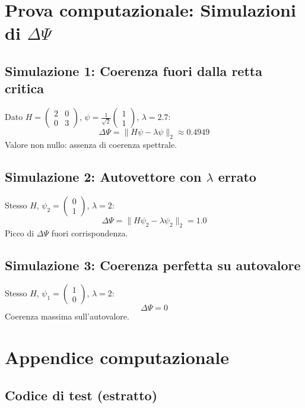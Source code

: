\documentclass[12pt]{article}
\theoremstyle{definition}
\begin{document}
\section{Prova computazionale: Simulazioni di $\Delta\Psi$}

\subsection{Simulazione 1: Coerenza fuori dalla retta critica}

Dato $H = \begin{pmatrix}2 & 0\\0 & 3\end{pmatrix}$, $\psi = \frac{1}{\sqrt{2}}\begin{pmatrix}1\\1\end{pmatrix}$, $\lambda=2.7$:
\[
\Delta\Psi = \| H\psi - \lambda\psi \|_2 \approx 0.4949
\]
Valore non nullo: assenza di coerenza spettrale.

\subsection{Simulazione 2: Autovettore con $\lambda$ errato}

Stesso $H$, $\psi_2 = \begin{pmatrix}0\\1\end{pmatrix}$, $\lambda=2$:
\[
\Delta\Psi = \| H\psi_2 - \lambda\psi_2 \|_2 = 1.0
\]
Picco di $\Delta\Psi$ fuori corrispondenza.

\subsection{Simulazione 3: Coerenza perfetta su autovalore}

Stesso $H$, $\psi_1 = \begin{pmatrix}1\\0\end{pmatrix}$, $\lambda=2$:
\[
\Delta\Psi = 0
\]
Coerenza massima sull’autovalore.

\section{Appendice computazionale}

\subsection{Codice di test (estratto)}
\end{document}
